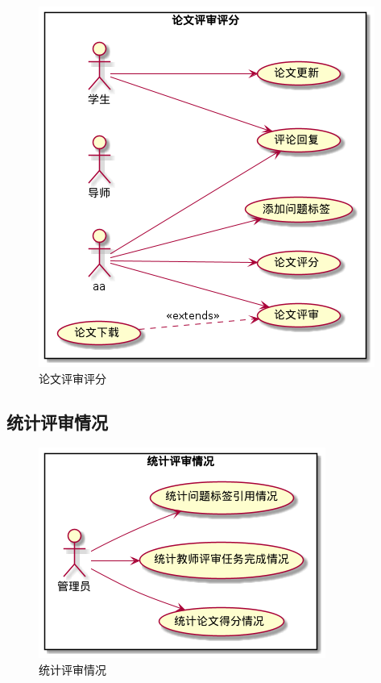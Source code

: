 \begin{figure}[h]
	\centering
	\includegraphics[scale = 0.6]{out/uml/用例图/3-论文评审评分/3-论文评审评分.png}
	\caption{\song\wuhao 论文评审评分}
\end{figure}

\subsection{统计评审情况}

\begin{figure}[h]
	\centering
	\includegraphics[scale = 0.6]{out/uml/用例图/4-统计评审情况/4-统计评审情况.png}
	\caption{\song\wuhao 统计评审情况}
\end{figure}
